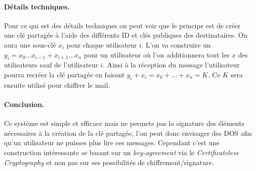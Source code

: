 \paragraph*{Détails techniques.} Pour ce qui est des détails techniques on peut voir que le principe est de créer une clé partagée à l'aide des différents ID et clés publiques des destinataires. On aura une sous-clé $x_i$ pour chaque utilisateur $i$. L'on va construire un $y_i = x_0 \dots x_{i-1} + x_{i+1} \dots x_n$ pour un utilisateur où l'on additionnera tout les $x$ des utilisateurs sauf de l'utilisateur $i$. Ainsi à la réception du message l'utilisateur pourra recréer la clé partagée en faisant $y_i + x_i = x_0 + \dots + x_n = K$. Ce $K$ sera ensuite utilisé pour chiffrer le mail.
\paragraph*{Conclusion.} Ce système est simple et efficace mais ne permets pas la signature des éléments nécessaires à la création de la clé partagée, l'on peut donc envisager des DOS afin qu'un utilisateur ne puisses plus lire ces messages. Cependant c'est une construction intéressante se basant sur un \textit{key-agreement} via le \textit{Certificateless Cryptography} et non pas sur ses possibilités de chiffrement/signature.



